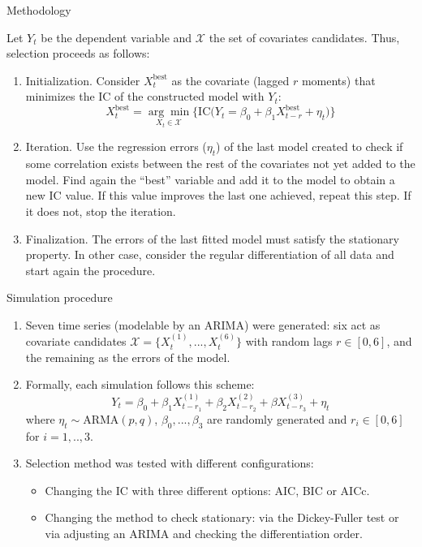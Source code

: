 \documentclass[10pt]{beamer}
\begin{document}
\begin{frame}{Methodology}
    

    Let $Y_t$ be the dependent variable and $\mathcal{X}$ the set of covariates candidates. Thus, selection proceeds as follows:
    
    \begin{enumerate}
        \item Initialization. Consider $X_t^\text{best}$ as the covariate (lagged $r$ moments) that minimizes the IC of the constructed model with $Y_t$:
        \[ X_t^\text{best} = \underset{X_t\in\mathcal{X}}{\arg\min} \Bigg\{ \text{IC}\Bigg( Y_t = \beta_0 + \beta_1 X_{t-r}^\text{best} + \eta_t \Bigg)\Bigg\} \] 
        \item Iteration. Use the regression errors ($\eta_t$) of the last model created to check if some correlation exists between the rest of the covariates not yet added to the model. Find again the ``best'' variable and add it to the model to obtain a new IC value. If this value improves the last one achieved, repeat this step. If it does not, stop the iteration.
        \item Finalization. The errors of the last fitted model must satisfy the stationary property. In other case, consider the regular differentiation of all data and start again the procedure.
    \end{enumerate}
\end{frame}

\begin{frame}{Simulation procedure}
    \begin{enumerate}
        \item Seven time series (modelable by an ARIMA) were generated: six act as covariate candidates $\mathcal{X}=\{X_t^{(1)}, ..., X_t^{(6)}\}$ with random lags $r\in[0, 6]$, and the remaining as the errors of the model.
        \item Formally, each simulation follows this scheme:
        \[ Y_t = \beta_0 + \beta_1 X_{t-r_1}^{(1)} + \beta_2 X_{t-r_2}^{(2)} + \beta X_{t-r_3}^{(3)} + \eta_t \] 
        where $\eta_t\sim\text{ARMA}(p,q)$, $\beta_0,...,\beta_3$ are randomly generated and $r_i\in[0,6] $ for $i=1,..,3$.
        \item Selection method was tested with different configurations:
        \begin{itemize}
            \item Changing the IC with three different options: AIC, BIC or AICc.
            \item Changing the method to check stationary: via the Dickey-Fuller test or via adjusting an ARIMA and checking the differentiation order.
        \end{itemize}
    \end{enumerate}
    
\end{frame}
\end{document}
